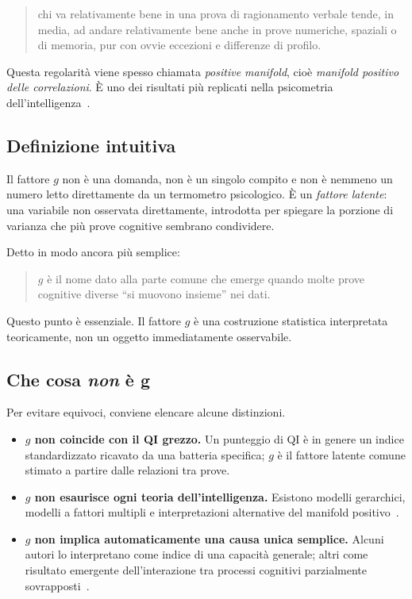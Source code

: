 \documentclass[10pt, a4paper]{article}
\theoremstyle{plain}
\theoremstyle{definition}
\theoremstyle{remark}
\begin{document}
\begin{quote}
chi va relativamente bene in una prova di ragionamento verbale tende, in media,
ad andare relativamente bene anche in prove numeriche, spaziali o di memoria,
pur con ovvie eccezioni e differenze di profilo.
\end{quote}

Questa regolarità viene spesso chiamata \emph{positive manifold}, cioè
\emph{manifold positivo delle correlazioni}. È uno dei risultati più replicati
nella psicometria dell'intelligenza~\cite{kovacs2016, vandermaas2006}.

\subsection{Definizione intuitiva}

Il fattore $g$ non è una domanda, non è un singolo compito e non è nemmeno un
numero letto direttamente da un termometro psicologico. È un \emph{fattore
latente}: una variabile non osservata direttamente, introdotta per spiegare la
porzione di varianza che più prove cognitive sembrano condividere.

Detto in modo ancora più semplice:
\begin{quote}
$g$ è il nome dato alla parte comune che emerge quando molte prove cognitive
diverse ``si muovono insieme'' nei dati.
\end{quote}

Questo punto è essenziale. Il fattore $g$ è una costruzione statistica
interpretata teoricamente, non un oggetto immediatamente osservabile.

\subsection{Che cosa \emph{non} è g}

Per evitare equivoci, conviene elencare alcune distinzioni.

\begin{itemize}
    \item \textbf{$g$ non coincide con il QI grezzo.} Un punteggio di QI è in
          genere un indice standardizzato ricavato da una batteria specifica;
          $g$ è il fattore latente comune stimato a partire dalle relazioni tra
          prove.
    \item \textbf{$g$ non esaurisce ogni teoria dell'intelligenza.} Esistono
          modelli gerarchici, modelli a fattori multipli e interpretazioni
          alternative del manifold positivo~\cite{cattell1963, carroll1993,
          sternberg1985, sternberg1999, kovacs2016, vandermaas2006}.
    \item \textbf{$g$ non implica automaticamente una causa unica semplice.}
          Alcuni autori lo interpretano come indice di una capacità generale;
          altri come risultato emergente dell'interazione tra processi cognitivi
          parzialmente sovrapposti~\cite{kovacs2016, vandermaas2006}.
\end{itemize}
\end{document}
